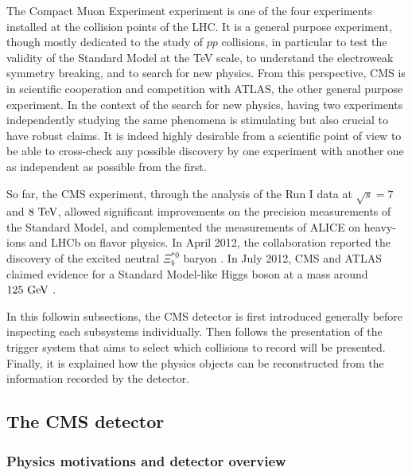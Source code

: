         The Compact Muon Experiment experiment  is one of the four experiments installed
        at the collision points of the LHC. It is a general purpose experiment, though mostly dedicated
        to the study of $pp$ collisions, in particular to test the validity of the Standard
        Model at the TeV scale, to understand the electroweak symmetry breaking, and to search for new physics. From this
        perspective, CMS is in scientific cooperation and competition with ATLAS, the
        other general purpose experiment. In the context of the search for new physics,
        having two experiments independently studying the same phenomena is
        stimulating but also crucial to have robust claims. It is indeed highly desirable
        from a scientific point of view to be able to cross-check any possible discovery
        by one experiment with another one as independent as possible from the first.

         So far, the CMS experiment, through the analysis of the Run I data at
        $\sqrt{s} = 7$ and $8~\text{TeV}$, allowed significant improvements on the precision measurements
        of the Standard Model, and complemented the measurements of ALICE on heavy-ions
        and LHCb on flavor physics. In April 2012, the collaboration reported the discovery
        of the excited neutral $\Xi^{*0}_b$ baryon \cite{XibBaryon}.
        In July 2012, CMS and ATLAS claimed evidence for a Standard Model-like Higgs boson
        at a mass around $125~\text{GeV}$ \cite{CMSHiggs, ATLASHiggs}.

        In this followin subsections, the CMS detector is first introduced generally before inspecting
        each subsystems individually. Then follows the presentation of the trigger system
        that aims to select which collisions to record will be presented. Finally, it is
        explained how the physics objects can be reconstructed from the information
        recorded by the detector.

        \subsection{The CMS detector}

            \subsubsection{Physics motivations and detector overview}

